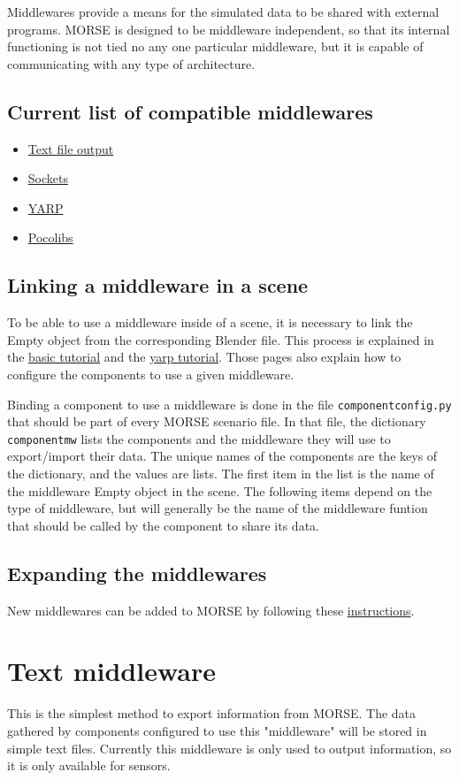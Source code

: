 \documentclass[twoside,a4paper,10pt]{report}
\newcommand{\dokutitlelevelone}[1]{\chapter{#1}}
\newcommand{\dokutitleleveltwo}[1]{\section{#1}}
\newcommand{\dokumonospace}[1]{\texttt{#1}}
\newcommand{\dokuitem}{\item}
\begin{document}
Middlewares provide a means for the simulated data to be shared with external programs. MORSE is designed to be middleware independent, so that its internal functioning is not tied no any one particular middleware, but it is capable of communicating with any type of architecture.


\dokutitleleveltwo{Current list of compatible middlewares}
\label{92515de7e8c9f43d6ca122cbbfd1809e}%

\begin{itemize}
\dokuitem  \hyperref[1cb251ec0d568de6a929b520c4aed8d1]{ Text file output}
\dokuitem  \hyperref[61f2529360aec54f5dc9804b842cf3fa]{ Sockets}
\dokuitem  \hyperref[ec46d0b85077d7a7fe8da2e2b4c70462]{ YARP}
\dokuitem  \hyperref[15f13a3fccdd1ef095539316b61c03c8]{ Pocolibs}
\end{itemize}

\dokutitleleveltwo{Linking a middleware in a scene}
\label{5ded332fc3ba470e4d4d290c9bf26a19}%

To be able to use a middleware inside of a scene, it is necessary to link the Empty object from the corresponding Blender file. This process is explained in the \hyperref[0575c8d592fb7b088226750aceec2b4e]{ basic tutorial} and the \hyperref[1dd029a60f7f3dd1deaf993ce4538edf]{ yarp tutorial}. Those pages also explain how to configure the components to use a given middleware.

Binding a component to use a middleware is done in the file \dokumonospace{component{\textunderscore}config.py} that should be part of every MORSE scenario file. In that file, the dictionary \dokumonospace{component{\textunderscore}mw} lists the components and the middleware they will use to export/import their data. The unique names of the components are the keys of the dictionary, and the values are lists. The first item in the list is the name of the middleware Empty object in the scene. The following items depend on the type of middleware, but will generally be the name of the middleware funtion that should be called by the component to share its data.


\dokutitleleveltwo{Expanding the middlewares}
\label{b3a6313d335453f4c7ad970485acc1a1}%

New middlewares can be added to MORSE by following these \hyperref[6a8f80abb2f3d2288ad863e67f2499a4]{ instructions}.


\dokutitlelevelone{Text middleware}
\label{f95f886458814bea9965b5a85aedb74b}%
\label{1cb251ec0d568de6a929b520c4aed8d1}%
This is the simplest method to export information from MORSE. The data gathered by components configured to use this "middleware" will be stored in simple text files. Currently this middleware is only used to output information, so it is only available for sensors.
\end{document}
